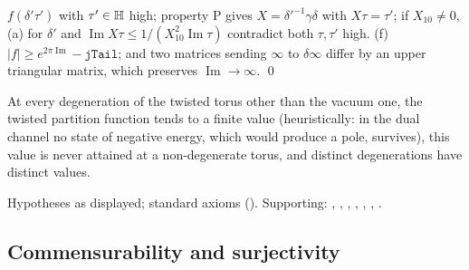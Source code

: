 $f(\delta'\tau')$ with $\tau'\in\mathbb{H}$ high; property P gives
$X=\delta'^{-1}\gamma\delta$ with $X\tau=\tau'$; if $X_{10}\ne0$, (a) for $\delta'$ and $\operatorname{Im}X\tau\le1/(X_{10}^2\operatorname{Im}\tau)$ contradict
both $\tau,\tau'$ high.  (f) $|f|\ge e^{2\pi\operatorname{Im}}-\mathtt{jTail}$; and two matrices sending $\infty$ to $\delta\infty$ differ by an upper
triangular matrix, which preserves $\operatorname{Im}\to\infty$. \qed
\begin{physics}At every degeneration of the twisted torus other than the vacuum one, the twisted partition function tends to a finite
value (heuristically: in the dual channel no state of negative energy, which would produce a pole, survives), this value is never attained at a non-degenerate torus, and distinct
degenerations have distinct values.\end{physics}
\begin{status}Hypotheses as displayed; standard axioms ().  Supporting:
, , , ,
, , .\end{status}

\subsection{Commensurability and surjectivity}

